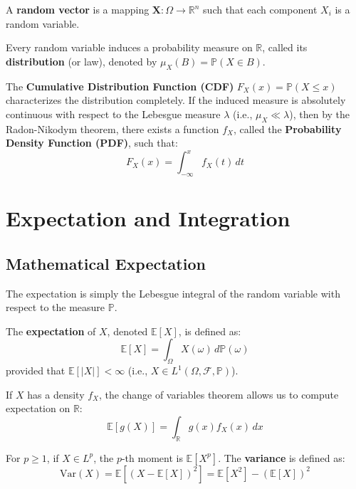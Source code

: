 \begin{definition}
A \textbf{random vector} is a mapping $\mathbf{X}: \Omega \to \mathbb{R}^n$ such that each component $X_i$ is a random variable.
\end{definition}

Every random variable induces a probability measure on $\mathbb{R}$, called its \textbf{distribution} (or law), denoted by $\mu_X(B) = \mathbb{P}(X \in B)$.

\begin{definition}
The \textbf{Cumulative Distribution Function (CDF)} $F_X(x) = \mathbb{P}(X \le x)$ characterizes the distribution completely.
If the induced measure is absolutely continuous with respect to the Lebesgue measure $\lambda$ (i.e., $\mu_X \ll \lambda$), then by the Radon-Nikodym theorem, there exists a function $f_X$, called the \textbf{Probability Density Function (PDF)}, such that:
\[ F_X(x) = \int_{-\infty}^x f_X(t) \, dt \]
\end{definition}

\section{Expectation and Integration}

\subsection{Mathematical Expectation}

The expectation is simply the Lebesgue integral of the random variable with respect to the measure $\mathbb{P}$.

\begin{definition}[Expectation]
The \textbf{expectation} of $X$, denoted $\mathbb{E}[X]$, is defined as:
\[ \mathbb{E}[X] = \int_\Omega X(\omega) \, d\mathbb{P}(\omega) \]
provided that $\mathbb{E}[|X|] < \infty$ (i.e., $X \in L^1(\Omega, \mathcal{F}, \mathbb{P})$).
\end{definition}

If $X$ has a density $f_X$, the change of variables theorem allows us to compute expectation on $\mathbb{R}$:
\[ \mathbb{E}[g(X)] = \int_{\mathbb{R}} g(x) f_X(x) \, dx \]

\begin{definition}
For $p \ge 1$, if $X \in L^p$, the $p$-th moment is $\mathbb{E}[X^p]$.
The \textbf{variance} is defined as:
\[ \text{Var}(X) = \mathbb{E}[(X - \mathbb{E}[X])^2] = \mathbb{E}[X^2] - (\mathbb{E}[X])^2 \]
\end{definition}

